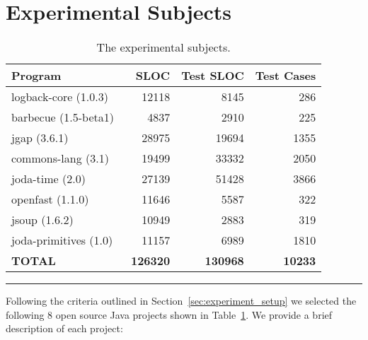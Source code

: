 \section{Experimental Subjects}
\label{sec:experiment_subjects}
\begin{table}[!t]
  \centering
  \begin{tabular}{|l|r|r|r|}
    \hline
    \rowcolor[RGB]{169,196,223}
    \textbf{Program} & \textbf{SLOC} & \textbf{Test SLOC} & \textbf{Test Cases} \\
    \hline logback-core (1.0.3)~\cite{logback} & 12118 & 8145 & 286 \\
    \hline barbecue (1.5-beta1)~\cite{barbecue} & 4837 & 2910 & 225 \\
    \hline jgap (3.6.1)~\cite{jgap} & 28975 & 19694 & 1355 \\
    \hline commons-lang (3.1)~\cite{commons-lang} & 19499 & 33332 & 2050 \\
    \hline joda-time (2.0)~\cite{joda-time} & 27139 & 51428 & 3866 \\
    \hline openfast (1.1.0)~\cite{openfast} & 11646 & 5587 & 322 \\
    \hline jsoup (1.6.2)~\cite{jsoup} & 10949 & 2883 & 319 \\
    \hline joda-primitives (1.0)~\cite{joda-primitives} & 11157 & 6989 & 1810 \\
    \hline \textbf{TOTAL} & \textbf{126320} & \textbf{130968} & \textbf{10233} \\
    \hline
  \end{tabular}
  \caption{The experimental subjects.}
  \vspace{2mm}
  \hrule
  \label{tab:experimental_subjects}
\end{table}

Following the criteria outlined in Section~\ref{sec:experiment_setup} we selected the following 8 open source Java projects shown in Table~\ref{tab:experimental_subjects}. We provide a brief description of each project:

